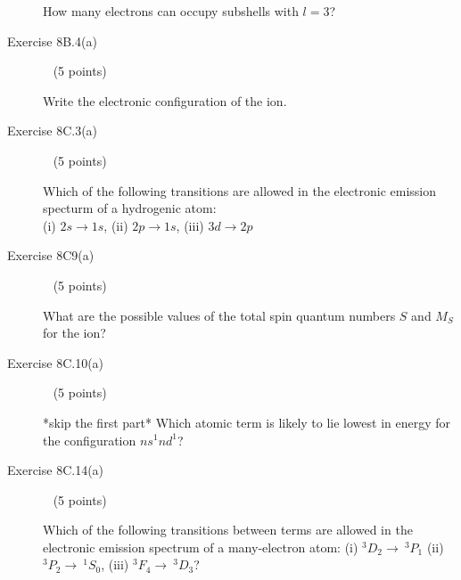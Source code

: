 \documentclass[10pt, letterpaper]{memoir}
\begin{document}
\begin{description}
	How many electrons can occupy subshells with $l=3$?
	
	\vspace{8em}
	\item [Exercise 8B.4(a)] ~ (5 points)
	
	Write the electronic configuration of the  ion.
	
	\vspace{8em}
	\item [Exercise 8C.3(a)] ~ (5 points)
	
	Which of the following transitions are allowed in the electronic emission specturm of a hydrogenic atom: \\(i) $2s\rightarrow1s$, (ii) $2p\rightarrow1s$, (iii) $3d\rightarrow2p$
	
	
	\vspace{8em}
	\item [Exercise 8C9(a)] ~ (5 points)
	
	What are the possible values of the total spin quantum numbers $S$ and $M_S$ for the  ion?
	
	\vspace{10em}
	\item [Exercise 8C.10(a)] ~ (5 points)
	
	*skip the first part* Which atomic term is likely to lie lowest in energy for the configuration $ns^1nd^1$?
	
	\vspace{12em}
	\item [Exercise 8C.14(a)] ~ (5 points)
	
	Which of the following transitions between terms are allowed in the electronic emission spectrum of a many-electron atom: (i) $^3D_2\rightarrow~^3P_1$ (ii) $^3P_2\rightarrow~^1S_0$, (iii) $^3F_4\rightarrow~^3D_3$?
\end{description}
\end{document}
